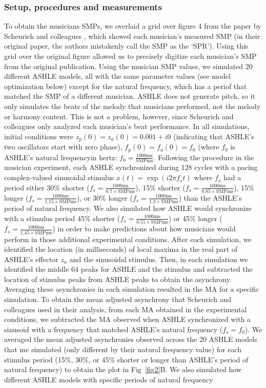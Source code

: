 \documentclass[10pt,letterpaper]{article}
\begin{document}
\subsubsection*{Setup, procedures and measurements}

To obtain the musicians SMPs, we overlaid a grid over figure 4 from the paper by Scheurich and colleagues \cite{scheurich2018tapping}, which showed each musician's measured SMP (in their original paper, the authors mistakenly call the SMP as the `SPR'). Using this grid over the original figure allowed us to precisely digitize each musician's SMP from the original publication. Using the musician SMP values, we simulated 20 different ASHLE models, all with the same parameter values (see model optimization below) except for the natural frequency, which has a periof that matched the SMP of a different musician. ASHLE does not generate pitch, so it only simulates the beats of the melody that musicians performed, not the melody or harmony content. This is not a problem, however, since Scheurich and colleagues only analyzed each musician's beat performance. In all simulations, initial conditions were $z_p(0)=z_a(0)= 0.001 + i0$ (indicating that ASHLE's two oscillators start with zero phase), $f_p(0)=f_a(0)=f_0$ (where $f_0$ is ASHLE's natural frequencyin hertz: $f_0=\frac{1000 \text{ms}}{\text{SMPms}}$. Following the procedure in the musician experiment, each ASHLE synchronized during 128 cycles with a pacing complex-valued sinusoidal stimulus $x(t)=\exp(i2\pi f_s t)$ where $f_s$ had a period either 30\% shorter ($f_s=\frac{1000 \text{ms}}{0.7 \times \text{SMPms}}$), 15\% shorter ($f_s=\frac{1000 \text{ms}}{0.85 \times \text{SMPms}}$), 15\% longer ($f_s=\frac{1000 \text{ms}}{1.15 \times \text{SMPms}}$), or 30\% longer ($f_s=\frac{1000 \text{ms}}{1.3 \times \text{SMPms}}$) than the ASHLE's period of natural frequency. We also simulated how ASHLE would synchronize with a stimulus period 45\% shorter ($f_s=\frac{1000 \text{ms}}{0.55 \times \text{SMPms}}$) or 45\% longer ($f_s=\frac{1000 \text{ms}}{1.45 \times \text{SMPms}}$) in order to make predictions about how musicians would perform in those additional experimental conditions. After each simulation, we identified the location (in milliseconds) of local maxima in the real part of ASHLE's effector $z_a$ and the sinusoidal stimulus. Then, in each simulation we identified the middle 64 peaks for ASHLE and the stimulus and subtracted the location of stimulus peaks from ASHLE peaks to obtain the asynchrony. Averaging these asynchronies in each simulation resulted in the MA for a specific simulation. To obtain the mean adjusted asynchrony that Scheurich and colleagues used in their analysis, from each MA obtained in the experimental conditions, we subtracted the MA observed when ASHLE synchronized with a sinusoid with a frequency that matched ASHLE's natural frequency ($f_s=f_0$). We averaged the mean adjusted asynchronies observed across the 20 ASHLE models that me simulated (only different by their natural frequency value) for each stimulus period (15\%, 30\%, or 45\% shorter or longer than ASHLE's period of natural frequency) to obtain the plot in Fig~\ref{fig2}B. We also simulated how different ASHLE models with specific periods of natural frequency 
\end{document}

